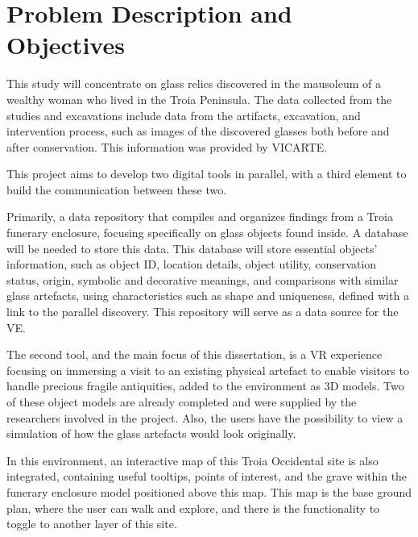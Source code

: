 
\section{Problem Description and Objectives}
\label{sec:problem_description_and_objectives} 
This study will concentrate on glass relics discovered in the mausoleum of a wealthy woman who lived in the Troia Peninsula. The data collected from the studies and excavations include 
data from the artifacts, excavation, and intervention process, such as images of the discovered glasses both before and after conservation. 
This information was provided by \gls{VICARTE}.

This project aims to develop two digital tools in parallel, with a third element to build the communication between these two.


Primarily, a data repository that compiles and organizes findings from 
a Troia funerary enclosure, focusing specifically on glass objects found inside. A database will be needed to store this data. 
This database will store essential objects' information, such as object ID, location details, object utility,
conservation status, origin, symbolic and decorative meanings, and comparisons with similar glass artefacts, using characteristics such as shape and uniqueness, defined with a link to the parallel discovery. 
This repository will serve as a data source for the \gls{VE}.

The second tool, and the main focus of this dissertation, is a \gls{VR} experience focusing on immersing a visit to an existing physical 
artefact to enable visitors to handle precious fragile antiquities, added to the environment as \gls{3D} models. 
Two of these object models are already completed and were supplied by the researchers involved in the project.
Also, the users have the possibility to view a simulation of how the glass artefacts would look originally. 

In this environment, an interactive map of this Troia Occidental site is also integrated, containing useful tooltips, points of interest, and the grave within the funerary enclosure model positioned above this map. 
This map is the base ground plan, where the user can walk and explore, and there is the functionality to toggle to another layer of this site.

